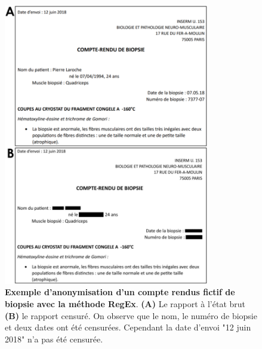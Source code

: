 \begin{figure}[!ht]
 \centering
 \includegraphics[width=0.8\textwidth]{figures/regex.png}
 \caption[Exemple anonymisation RegEx]{\textbf{Exemple d'anonymisation d'un compte rendus fictif de biopsie avec la méthode RegEx}. \textbf{(A)} Le rapport à l'état brut \textbf{(B)} le rapport censuré. On observe que le nom, le numéro de biopsie et deux dates ont été censurées. Cependant la date d'envoi "12 juin 2018" n'a pas été censurée.}
 \label{fig:regex}
\end{figure}


